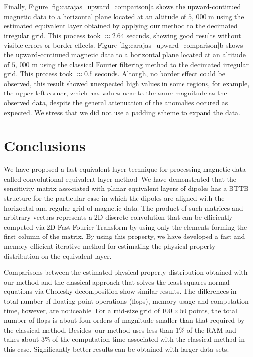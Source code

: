 \documentclass[manuscript]{geophysics}
\begin{document}
Finally, Figure \ref{fig:carajas_upward_comparison}a shows the upward-continued magnetic data to a
horizontal plane located at an altitude of $5, \,000$ m using the estimated equivalent layer obtained by applying our
method to the decimated irregular grid. This process took $\approx 2.64$ seconds, showing good results 
without visible errors or border effects. 
Figure \ref{fig:carajas_upward_comparison}b shows the upward-continued magnetic data to a
horizontal plane located at an altitude of $5, \,000$ m using the classical Fourier filtering method to the decimated irregular grid.
This process took $\approx 0.5$ seconds. Altough, no border effect could be observed, this result showed unexpected high values in some regions, for example, the upper left corner,
which has values near to the same magnitude as the observed data, despite the general attenuation of the anomalies occured as expected. We stress that we did not use a padding scheme to expand the data.

\section{Conclusions}

We have proposed a fast equivalent-layer technique for processing magnetic data called
convolutional equivalent layer method.
We have demonstrated that the sensitivity matrix associated with planar 
equivalent layers of dipoles has a BTTB structure for the particular case in which 
the dipoles are aligned with the horizontal and regular grid of magnetic data.
The product of such matrices and arbitrary vectors represents a 2D discrete convolution
that can be efficiently computed via 2D Fast Fourier Transform by using only the 
elements forming the first column of the matrix.
By using this property, we have developed a fast and memory efficient iterative method for 
estimating the physical-property distribution on the equivalent layer.

Comparisons between the estimated physical-property distribution obtained with our method and 
the classical approach that solves the least-squares normal equations via Cholesky decomposition 
show similar results. 
The differences in total number of floating-point operations (flops), memory usage and computation 
time, however, are noticeable. 
For a mid-size grid of $100 \times 50$ points, the total number of flops is about four orders of
magnitude smaller than that required by the classical method. Besides, our method uses
less than $1\%$ of the RAM and takes about $3\%$ of the computation time associated with
the classical method in this case.%
Significantly better results can be obtained with larger data sets.
\end{document}
